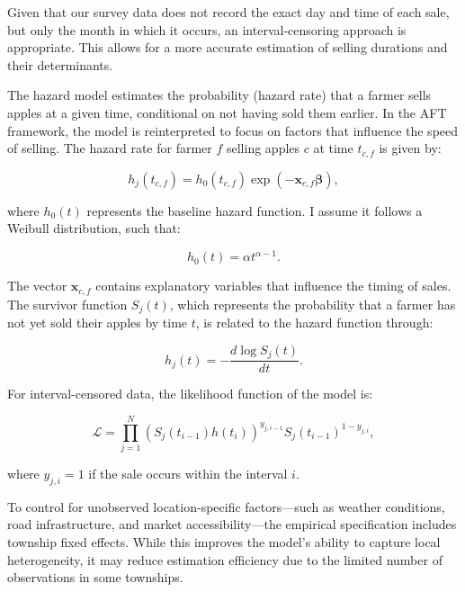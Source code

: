 \documentclass[12pt]{article}
\begin{document}
Given that our survey data does not record the exact day and time of each sale, but only the month in which it occurs, an interval-censoring approach is appropriate. This allows for a more accurate estimation of selling durations and their determinants.  

The hazard model estimates the probability (hazard rate) that a farmer sells apples at a given time, conditional on not having sold them earlier. In the AFT framework, the model is reinterpreted to focus on factors that influence the speed of selling. The hazard rate for farmer $f$ selling apples $c$ at time $t_{c,f}$ is given by:  

\begin{equation}
    h_j(t_{c,f}) = h_0(t_{c,f}) \exp\left(-\mathbf{x}_{c,f} \boldsymbol{\beta}\right),
\end{equation}

where $h_0(t)$ represents the baseline hazard function. I assume it follows a Weibull distribution, such that:  

\begin{equation}
    h_0(t) = \alpha t^{\alpha-1}.
\end{equation}

The vector $\mathbf{x}_{c,f}$ contains explanatory variables that influence the timing of sales. The survivor function $S_j(t)$, which represents the probability that a farmer has not yet sold their apples by time $t$, is related to the hazard function through:  

\begin{equation}
    h_j(t) = -\frac{d \log S_j(t)}{dt}.
\end{equation}

For interval-censored data, the likelihood function of the model is:  

\begin{equation}
    \mathcal{L} = \prod_{j=1}^N \left(S_j(t_{i-1}) h(t_i)\right)^{y_{j,i-1}} S_j(t_{i-1})^{1-y_{j,i}},
\end{equation}

where $y_{j,i} = 1$ if the sale occurs within the interval $i$.  

To control for unobserved location-specific factors—such as weather conditions, road infrastructure, and market accessibility—the empirical specification includes township fixed effects. While this improves the model’s ability to capture local heterogeneity, it may reduce estimation efficiency due to the limited number of observations in some townships.
\end{document}
